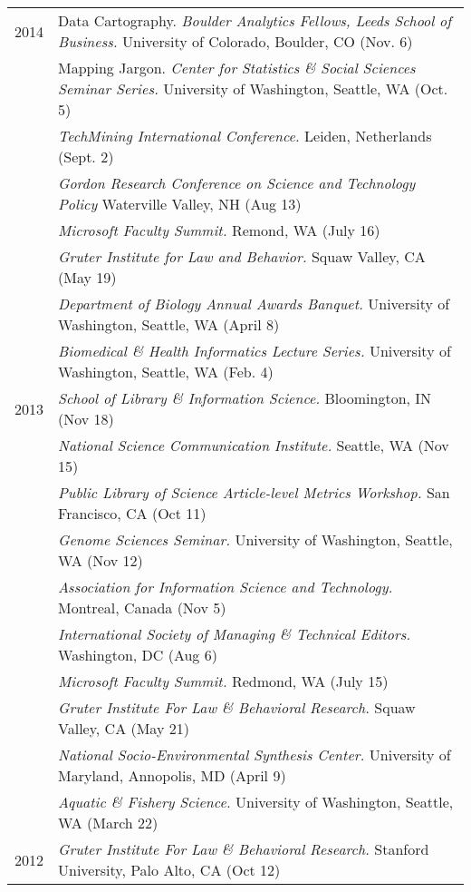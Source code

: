 \documentclass[11pt]{article}
\begin{document}
\begin{longtable}{p{0.5in}|p{5.5in}}
  2014 & Data Cartography. \textit{Boulder Analytics Fellows, Leeds School of Business.} University of Colorado, Boulder, CO (Nov. 6) \\
  		&  Mapping Jargon. \textit{Center for Statistics \& Social Sciences Seminar Series.} University of Washington, Seattle, WA (Oct. 5) \\
  		&  \textit{TechMining International Conference.} Leiden, Netherlands (Sept. 2) \\
  		&  \textit{Gordon Research Conference on Science and Technology Policy} Waterville Valley, NH (Aug 13) \\
  		&  \textit{Microsoft Faculty Summit.} Remond, WA (July 16) \\
  		&  \textit{Gruter Institute for Law and Behavior.} Squaw Valley, CA (May 19) \\
  		&  \textit{Department of Biology Annual Awards Banquet.} University of Washington, Seattle, WA (April 8) \\
  		&  \textit{Biomedical \& Health Informatics Lecture Series.} University of Washington, Seattle, WA (Feb. 4) \\
  2013 	&  \textit{School of Library \& Information Science.} Bloomington, IN (Nov 18) \\
  		&  \textit{National Science Communication Institute.} Seattle, WA (Nov 15) \\
  		&  \textit{Public Library of Science Article-level Metrics Workshop.} San Francisco, CA (Oct 11) \\
  		&  \textit{Genome Sciences Seminar.} University of Washington, Seattle, WA (Nov 12) \\
  		&  \textit{Association for Information Science and Technology.} Montreal, Canada (Nov 5) \\
  		&  \textit{International Society of Managing \& Technical Editors.} Washington, DC (Aug 6) \\
  		&  \textit{Microsoft Faculty Summit.} Redmond, WA (July 15) \\
  		&  \textit{Gruter Institute For Law \& Behavioral Research.} Squaw Valley, CA (May 21) \\
  		&  \textit{National Socio-Environmental Synthesis Center.} University of Maryland, Annopolis, MD (April 9) \\
  		&  \textit{Aquatic \& Fishery Science.} University of Washington, Seattle, WA (March 22) \\
  2012	&  \textit{Gruter Institute For Law \& Behavioral Research.} Stanford University, Palo Alto, CA (Oct 12) \\

\end{longtable}
\end{document}
